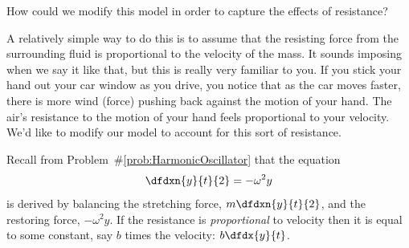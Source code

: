 How could we modify this model in order to capture the effects of
resistance?

A relatively simple way to do this is to assume that the
resisting force from the surrounding fluid is proportional to the
velocity of the mass.  It sounds imposing when we say it like that,
but this is really very familiar to you. If you stick your hand out
your car window as you drive, you notice that as the car moves faster,
there is more wind (force) pushing back against the motion of your
hand. The air's resistance to the motion of your hand feels proportional
to your velocity. We'd like to modify our model to account for this
sort of resistance.

Recall from Problem~\#\ref{prob:HarmonicOscillator} that the equation
$$
\dfdxn{y}{t}{2}=-\omega^2y
$$
is derived by balancing the stretching force, $m\dfdxn{y}{t}{2}$, and
the restoring force, $-\omega^2y$. If the resistance is \emph{proportional}
to velocity then it is equal to some constant, say $b$ times the velocity: $b\dfdx{y}{t}$.





